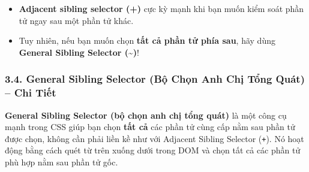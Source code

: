 \documentclass[11pt,oneside]{book}
\newcommand{\thd}[1]{\textcolor{white}{\textbf{\strut #1}}}
\newcommand{\codeinline}[1]{\textcolor{accentOrange}{\texttt{#1}}}
\begin{document}
\begin{prettyTableBox}
\sffamily\small
{}
\end{prettyTableBox}

\begin{tipBox}
\begin{itemize}[leftmargin=1.5em, itemsep=3pt, parsep=0pt]
    \item \textbf{Adjacent sibling selector (+)} cực kỳ mạnh khi bạn muốn kiểm soát phần tử ngay sau một phần tử khác.
    \item Tuy nhiên, nếu bạn muốn chọn \textbf{tất cả phần tử phía sau}, hãy dùng \textbf{General Sibling Selector (\textasciitilde{})}!
\end{itemize}
\end{tipBox}


\subsubsection{3.4. General Sibling Selector (Bộ Chọn Anh Chị Tổng Quát) -- Chi Tiết}

\begin{conceptBox}
\textbf{General Sibling Selector (bộ chọn anh chị tổng quát)} là một công cụ mạnh trong CSS giúp bạn chọn \textbf{tất cả} các phần tử cùng cấp nằm sau phần tử được chọn, không cần phải liền kề như với Adjacent Sibling Selector (\codeinline{+}). Nó hoạt động bằng cách quét từ trên xuống dưới trong DOM và chọn tất cả các phần tử phù hợp nằm sau phần tử gốc.
\end{conceptBox}
\end{document}
